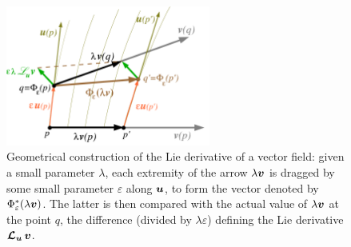 \begin{figure}
\centerline{\includegraphics[width=0.6\textwidth]{bas_lie_deriv.pdf}}
\caption[]{\label{f:bas:deriv}
\footnotesize
Geometrical construction of the Lie derivative of a
vector field: given a small parameter $\lambda$, each extremity of the arrow
$\lambda\bm{v}$ is dragged by some small parameter $\varepsilon$
along $\bm{u}$, to form
the vector denoted by $\Phi_\varepsilon^*(\lambda\bm{v})$. The latter is then compared with
the actual value of $\lambda\bm{v}$ at the point $q$, the difference (divided
by $\lambda\varepsilon$) defining the Lie derivative $\bm{\mathcal{L}}_{\bm{u}}\,\bm{v}$.}
\end{figure}


